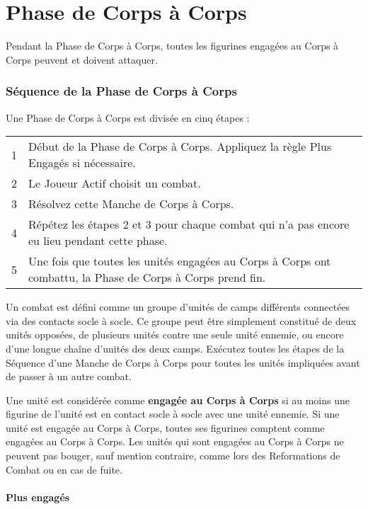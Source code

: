 
\part{Phase de Corps à Corps}

Pendant la Phase de Corps à Corps, toutes les figurines engagées au Corps à Corps peuvent et doivent attaquer.

\section{Séquence de la Phase de Corps à Corps}

Une Phase de Corps à Corps est divisée en cinq étapes :

\hspace*{0.3cm}
\begin{tabular}{c|m{14cm}}
1 & Début de la Phase de Corps à Corps. Appliquez la règle Plus Engagés si nécessaire. \tabularnewline
2 & Le Joueur Actif choisit un combat. \tabularnewline
3 & Résolvez cette Manche de Corps à Corps. \tabularnewline
4 & Répétez les étapes 2 et 3 pour chaque combat qui n'a pas encore eu lieu pendant cette phase. \tabularnewline
5 & Une fois que toutes les unités engagées au Corps à Corps ont combattu, la Phase de Corps à Corps prend fin. \tabularnewline
\end{tabular}

Un combat est défini comme un groupe d'unités de camps différents connectées via des contacts socle à socle. Ce groupe peut être simplement constitué de deux unités opposées, de plusieurs unités contre une seule unité ennemie, ou encore d'une longue chaîne d'unités des deux camps. Exécutez toutes les étapes de la Séquence d'une Manche de Corps à Corps pour toutes les unités impliquées avant de passer à un autre combat.

Une unité est considérée comme \textbf{engagée au Corps à Corps} si au moins une figurine de l'unité est en contact socle à socle avec une unité ennemie. Si une unité est engagée au Corps à Corps, toutes ses figurines comptent comme engagées au Corps à Corps. Les unités qui sont engagées au Corps à Corps ne peuvent pas bouger, sauf mention contraire, comme lors des Reformations de Combat ou en cas de fuite.

\subsection{Plus engagés}

